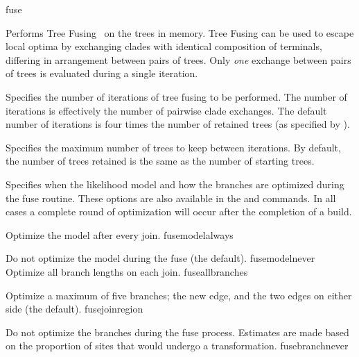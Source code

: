 \begin{command}{fuse}{}


\begin{poydescription}
Performs Tree Fusing~\cite{goloboff1999} on the trees in memory. 
Tree Fusing can be used to escape local optima
by exchanging clades with identical composition of terminals, differing in 
arrangement between pairs of trees. Only \emph{one} exchange between 
pairs of trees is evaluated during a single iteration.
\end{poydescription}

\begin{arguments}
{Specifies the number of iterations of tree fusing to be performed. The
number of iterations is effectively the number of pairwise clade exchanges. 
The default number of iterations is four times the number of retained
trees (as specified by ).}
{}

{Specifies the maximum number of trees to keep between iterations.
By default, the number of trees retained is the same as the number
of starting trees.}
{}

{Specifies when the likelihood model and how the branches are
optimized during the fuse routine. These options are also available
in the  and  commands. In all
cases a complete round of optimization will occur after the
completion of a build.

\begin{description}

{Optimize the model after every join.}
{fusemodelalways}

{Do not optimize the model during the fuse (the default).}
{fusemodelnever}
\\
{Optimize all branch lengths on each join.}
{fuseallbranches}

{Optimize a maximum of five branches; the new edge, and the two
edges on either side (the default).}
{fusejoinregion}

{Do not optimize the branches during the fuse process.
Estimates are made based on the proportion of sites that
would undergo a transformation.}
{fusebranchnever}


\end{description}}
\end{arguments}
\end{command}
